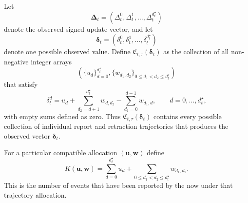 \documentclass{article}
\theoremstyle{definition}
\theoremstyle{remark}
\begin{document}
Let
\begin{equation}
    \boldsymbol{\Delta}_t
    =
    \left(
    \Delta_t^0,\Delta_t^1,\dots,\Delta_t^{d_t^{\star}}
    \right)
\end{equation}
denote the observed signed-update vector, and let
\begin{equation}
    \boldsymbol{\delta}_t
    = \left(\delta^0_t,\delta^1_t,\dots,\delta^{d_t^{\star}}_t\right)
\end{equation}
denote one possible observed value. Define $\mathfrak C_{t,\tau}(\boldsymbol\delta_t)$ as the collection of all non-negative integer arrays
\begin{equation}
    \left(
    \{u_d\}_{d=0}^{d_t^{\star}},
    \{w_{d_1,d_2}\}_{0\leq d_1<d_2\leq d_t^{\star}}
    \right)
\end{equation}
that satisfy
\begin{equation}\label{compatibility}
    \delta^d_t
    =
    u_d
    +
    \sum_{d_2=d+1}^{d_t^{\star}}w_{d,d_2}
    -
    \sum_{d_1=0}^{d-1}w_{d_1,d},
    \qquad
    d=0,\dots,d_t^{\star},
\end{equation}
with empty sums defined as zero. Thus $\mathfrak C_{t,\tau}(\boldsymbol\delta_t)$ contains every possible collection of individual report and retraction trajectories that produces the observed vector $\boldsymbol\delta_t$.

For a particular compatible allocation $(\boldsymbol u,\boldsymbol w)$ define
\begin{equation}\label{Kcum}
    K(\boldsymbol u,\boldsymbol w)
    =
    \sum_{d=0}^{d_t^{\star}}u_d
    +
    \sum_{0\leq d_1<d_2\leq d_t^{\star}}w_{d_1,d_2}.
\end{equation}
This is the number of events that have been reported by the now under that trajectory allocation.
\end{document}
